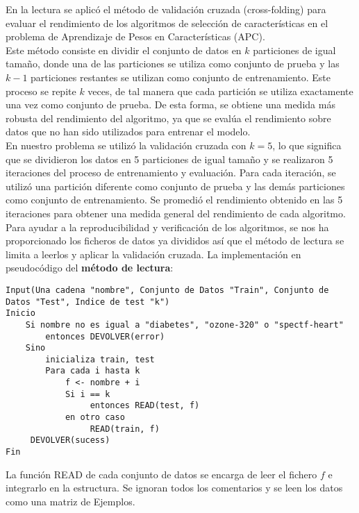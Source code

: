 En la lectura se aplicó el método de validación cruzada (cross-folding) para evaluar el rendimiento de los algoritmos de selección de características en el problema de Aprendizaje de Pesos en Características (APC). \\

Este método consiste en dividir el conjunto de datos en $k$ particiones de igual tamaño, donde una de las particiones se utiliza como conjunto de prueba y las $k-1$ particiones restantes se utilizan como conjunto de entrenamiento. Este proceso se repite $k$ veces, de tal manera que cada partición se utiliza exactamente una vez como conjunto de prueba. De esta forma, se obtiene una medida más robusta del rendimiento del algoritmo, ya que se evalúa el rendimiento sobre datos que no han sido utilizados para entrenar el modelo. \\

En nuestro problema se utilizó la validación cruzada con $k=5$, lo que significa que se dividieron los datos en 5 particiones de igual tamaño y se realizaron 5 iteraciones del proceso de entrenamiento y evaluación. Para cada iteración, se utilizó una partición diferente como conjunto de prueba y las demás particiones como conjunto de entrenamiento. Se promedió el rendimiento obtenido en las 5 iteraciones para obtener una medida general del rendimiento de cada algoritmo. \\

Para ayudar a la reproducibilidad y verificación de los algoritmos, se nos ha proporcionado los ficheros de datos ya divididos así que el método de lectura se limita a leerlos y aplicar la validación cruzada. La implementación en pseudocódigo del \textbf{método de lectura}:

\begin{verbatim}
Input(Una cadena "nombre", Conjunto de Datos "Train", Conjunto de Datos "Test", Indice de test "k")
Inicio
    Si nombre no es igual a "diabetes", "ozone-320" o "spectf-heart"
        entonces DEVOLVER(error)
    Sino
        inicializa train, test
        Para cada i hasta k
            f <- nombre + i
            Si i == k
                 entonces READ(test, f)
            en otro caso
                 READ(train, f)
     DEVOLVER(sucess)
Fin
\end{verbatim}

La función READ de cada conjunto de datos se encarga de leer el fichero $f$ e integrarlo en la estructura. Se ignoran todos los comentarios y se leen los datos como una matriz de Ejemplos.\\

